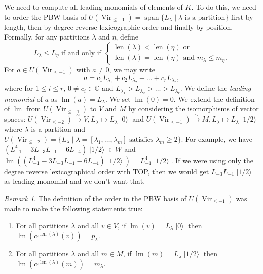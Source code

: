 \documentclass[a4paper, 12pt, reqno]{amsart}
\theoremstyle{remark}
\newtheorem{remark}[theorem]{Remark}
\DeclareMathOperator{\Vir}{Vir}
\DeclareMathOperator{\lm}{lm}
\DeclareMathOperator{\vspan}{span}
\DeclareMathOperator{\len}{len}
\DeclareMathOperator{\vac}{|0\rangle}
\DeclareMathOperator{\vachalf}{|1/2\rangle}
\begin{document}
We need to compute all leading monomials of elements of $K$.
To do this, we need to order the PBW basis of $U(\Vir_{\le -1}) = \vspan\{L_\lambda \mid \lambda\text{ is a partition}\}$ first by length, then by degree reverse lexicographic order and finally by position.
Formally, for any partitions $\lambda$ and $\eta$, define
\begin{equation*}
  L_\lambda \le L_\eta \text{ if and only if }
  \begin{cases}
    \len(\lambda) < \len(\eta)\text{ or } \\
    \len(\lambda) = \len(\eta)\text{ and }m_\lambda \le m_\eta.
  \end{cases}
\end{equation*}
For $a \in U(\Vir_{\le -1})$ with $a \neq 0$, we may write
\begin{equation*}
  a = c_1L_{\lambda_1} + c_2L_{\lambda_2} + \dots + c_rL_{\lambda_r},
\end{equation*}
where for $1 \le i\le r$, $0 \neq c_i \in \mathbb{C}$ and $L_{\lambda_1} > L_{\lambda_2} > \dots > L_{\lambda_r}$.
We define the \emph{leading monomial} of $a$ as $\lm(a) = L_\lambda$. 
We set $\lm(0) = 0$.
We extend the definition of $\lm$ from $U(\Vir_{\le -1})$ to $V$ and $M$ by considering the isomorphisms of vector spaces: $U(\Vir_{\le -2}) \xrightarrow{\sim} V, L_\lambda \mapsto L_\lambda\vac$ and $U(\Vir_{\le -1}) \xrightarrow{\sim} M, L_\lambda \mapsto L_\lambda\vachalf$ where $\lambda$ is a partition and $U(\Vir_{\le -2}) = \{L_\lambda \mid \lambda = [\lambda_1, \dots, \lambda_m]\text{ satisfies }\lambda_m \ge 2\}$.
For example, we have $(L_{-1}^4 - 3L_{-3}L_{-1} - 6L_{-4})\vachalf \in W$ and $\lm((L_{-1}^4 - 3L_{-3}L_{-1} - 6L_{-4})\vachalf) = L_{-1}^4\vachalf$.
If we were using only the degree reverse lexicographical order with TOP, then we would get $L_{-3}L_{-1}\vachalf$ as leading monomial and we don't want that.

\begin{remark}
  \label{rmk:5}
  The definition of the order in the PBW basis of $U(\Vir_{\le -1})$ was made to make the following statements true:
  \begin{enumerate}
  \item For all partitions $\lambda$ and all $v \in V$, if $\lm(v) = L_\lambda\vac$ then $\lm(\alpha^{\len(\lambda)}(v)) = p_\lambda$.
  \item For all partitions $\lambda$ and all $m \in M$, if $\lm(m) = L_\lambda\vachalf$ then $\lm(\alpha^{\len(\lambda)}(m)) = m_\lambda$.
  \end{enumerate}
\end{remark}
\end{document}
